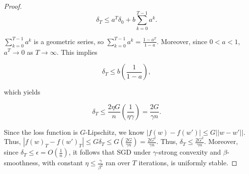 \documentclass[twoside,11pt]{article}
\begin{document}
\begin{proof}
\begin{equation}
\delta_{T} \leq a^T\delta_0 + b \sum_{k=0}^{T-1}a^k.
\end{equation}

\noindent
$\sum_{k=0}^{T-1}a^k$ is a geometric series, so $\sum_{k=0}^{T-1}a^k = \frac{1-a^T}{1-a}$. Moreover, since $0 < a < 1$, $a^T \rightarrow 0$ as $T \rightarrow \infty$. This implies

\begin{equation}
\delta_T \leq b(\frac{1}{1-a}),
\end{equation}

\noindent
which yields

\begin{equation}
\delta_T \leq \frac{2 \eta G}{n}(\frac{1}{\eta \gamma}) = \frac{2G}{\gamma n}.
\end{equation}

\noindent
Since the loss function is $G$-Lipschitz, we know $|f(w) - f(w')| \leq G||w - w'||$. Thus, $|f(w)_T - f(w')_T| \leq G\delta_T \leq G(\frac{2G}{\gamma n}) = \frac{2G^2}{\gamma n}$. Thus, $\delta_T \leq \frac{2G^2}{\gamma n}$. Moreover, since $\delta_T \leq \epsilon = O(\frac{1}{n})$, it follows that SGD under $\gamma$-strong convexity and $\beta$-smoothness, with constant $\eta \leq \frac{\gamma}{\beta^2}$ ran over $T$ iterations, is uniformly stable. 
\end{proof}


\end{document}
